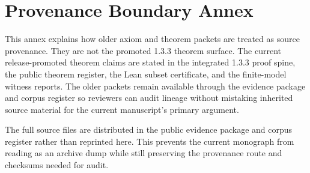 \section{Provenance Boundary Annex}
\label{app:historical-core-12-provenance-annex}

This annex explains how older axiom and theorem packets are treated as source
provenance. They are not the promoted 1.3.3 theorem surface. The current
release-promoted theorem claims are stated in the integrated 1.3.3 proof spine,
the public theorem register, the Lean subset certificate, and the finite-model
witness reports. The older packets remain available through the evidence
package and corpus register so reviewers can audit lineage without mistaking
inherited source material for the current manuscript's primary argument.

The full source files are distributed in the public evidence package and corpus
register rather than reprinted here. This prevents the current monograph from
reading as an archive dump while still preserving the provenance route and
checksums needed for audit.
